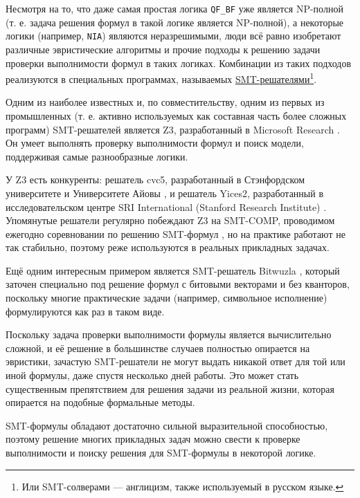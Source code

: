 
Несмотря на то, что даже самая простая логика \texttt{QF\_BF} уже является NP-полной (т. е. задача решения формул в такой логике является NP-полной), а некоторые логики (например, \texttt{NIA}) являются неразрешимыми, люди всё равно изобретают различные эвристические алгоритмы и прочие подходы к решению задачи проверки выполнимости формул в таких логиках. Комбинации из таких подходов реализуются в специальных программах, называемых \underline{SMT-решателями}\footnote{Или SMT-солверами --- англицизм, также используемый в русском языке.}.

Одним из наиболее известных и, по совместительству, одним из первых из промышленных (т. е. активно используемых как составная часть более сложных программ) SMT-решателей является Z3, разработанный в Microsoft Research \cite{z3-paper}. Он умеет выполнять проверку выполнимости формул и поиск модели, поддерживая самые разнообразные логики.

У Z3 есть конкуренты: решатель cvc5, разработанный в Стэнфордском университете и Университете Айовы \cite{cvc5-paper}, и решатель Yices2, разработанный в исследовательском центре SRI International (Stanford Research Institute) \cite{yices2-paper}. Упомянутые решатели регулярно побеждают Z3 на SMT-COMP, проводимом ежегодно соревновании по решению SMT-формул \cite{smt-comp-paper} \cite{smt-comp-website}, но на практике работают не так стабильно, поэтому реже используются в реальных прикладных задачах.

Ещё одним интересным примером является SMT-решатель Bitwuzla \cite{bitwuzla-paper}, который заточен специально под решение формул с битовыми векторами и без кванторов, поскольку многие практические задачи (например, символьное исполнение) формулируются как раз в таком виде.

Поскольку задача проверки выполнимости формулы является вычислительно сложной, и её решение в большинстве случаев полностью опирается на эвристики, зачастую SMT-решатели не могут выдать никакой ответ для той или иной формулы, даже спустя несколько дней работы. Это может стать существенным препятствием для решения задачи из реальной жизни, которая опирается на подобные формальные методы.


SMT-формулы обладают достаточно сильной выразительной способностью, поэтому решение многих прикладных задач можно свести к проверке выполнимости и поиску решения для SMT-формулы в некоторой логике.

